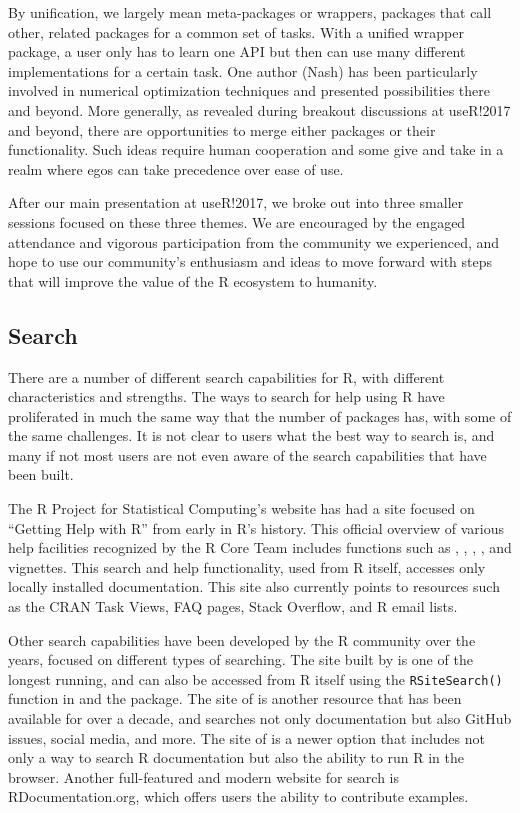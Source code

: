 By unification, we largely mean meta-packages or wrappers, packages that
call other, related packages for a common set of tasks. With a unified
wrapper package, a user only has to learn one API but then can use many
different implementations for a certain task. One author (Nash) has been
particularly involved in numerical optimization techniques and presented
possibilities there and beyond. More generally, as revealed during
breakout discussions at useR!2017 and beyond, there are opportunities to
merge either packages or their functionality. Such ideas require human
cooperation and some give and take in a realm where egos can take
precedence over ease of use.

After our main presentation at useR!2017, we broke out into three
smaller sessions focused on these three themes. We are encouraged by the
engaged attendance and vigorous participation from the community we
experienced, and hope to use our community's enthusiasm and ideas to
move forward with steps that will improve the value of the R ecosystem
to humanity.

\hypertarget{search}{%
\subsection{Search}\label{search}}

There are a number of different search capabilities for R, with
different characteristics and strengths. The ways to search for help
using R have proliferated in much the same way that the number of
packages has, with some of the same challenges. It is not clear to users
what the best way to search is, and many if not most users are not even
aware of the search capabilities that have been built.

The R Project for Statistical Computing's website has had a site focused
on ``Getting Help with R'' \citep{gettinghelp} from early in R's
history. This official overview of various help facilities recognized by
the R Core Team includes functions such as , ,
, , and vignettes. This search and
help functionality, used from R itself, accesses only locally installed
documentation. This site also currently points to resources such as the
CRAN Task Views, FAQ pages, Stack Overflow, and R email lists.

Other search capabilities have been developed by the R community over
the years, focused on different types of searching. The site built by
\citet{baron} is one of the longest running, and can also be accessed
from R itself using the \texttt{RSiteSearch()} function in
 \citep{utils} and the  package. The site of
\citet{goodman} is another resource that has been available for over a
decade, and searches not only documentation but also GitHub issues,
social media, and more. The site of \citet{rdrrio} is a newer option
that includes not only a way to search R documentation but also the
ability to run R in the browser. Another full-featured and modern
website for search is RDocumentation.org, which offers users the ability
to contribute examples.

